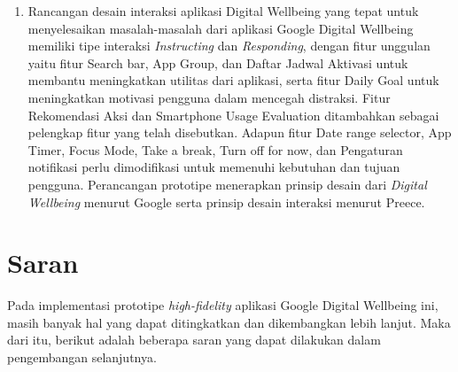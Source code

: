 \begin{enumerate}
\begin{enumerate}[label=\alph*.]
    \end{enumerate}
    
  \item Rancangan desain interaksi aplikasi Digital Wellbeing yang tepat untuk menyelesaikan masalah-masalah dari aplikasi Google Digital Wellbeing memiliki tipe interaksi \textit{Instructing} dan \textit{Responding}, dengan fitur unggulan yaitu fitur Search bar, App Group, dan Daftar Jadwal Aktivasi untuk membantu meningkatkan utilitas dari aplikasi, serta fitur Daily Goal untuk meningkatkan motivasi pengguna dalam mencegah distraksi. Fitur Rekomendasi Aksi dan Smartphone Usage Evaluation ditambahkan sebagai pelengkap fitur yang telah disebutkan. Adapun fitur Date range selector, App Timer, Focus Mode, Take a break, Turn off for now, dan Pengaturan notifikasi perlu dimodifikasi untuk memenuhi kebutuhan dan tujuan pengguna. Perancangan prototipe menerapkan prinsip desain dari \textit{Digital Wellbeing} menurut Google serta prinsip desain interaksi menurut Preece.  
   
\end{enumerate}

\section{Saran}
Pada implementasi prototipe \textit{high-fidelity} aplikasi Google Digital Wellbeing ini, masih banyak hal yang dapat ditingkatkan dan dikembangkan lebih lanjut. Maka dari itu, berikut adalah beberapa saran yang dapat dilakukan dalam pengembangan selanjutnya.

